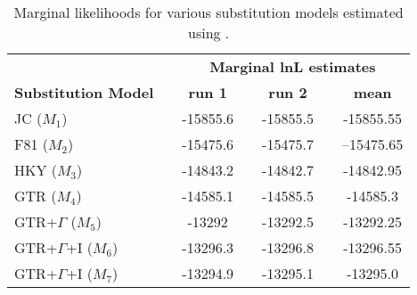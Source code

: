 \begin{Form}
\begin{table}[h]
\centering
\caption{\small Marginal likelihoods for various substitution models estimated using \RevBayes.}
\begin{tabular}{l c c c c c c}
\hline
\multicolumn{1}{l}{\textbf{ }} &\multicolumn{1}{r}{\textbf{ }} & \multicolumn{5}{c}{\textbf{Marginal lnL estimates}} \\ 
\cline{3-7}
\multicolumn{1}{l}{\textbf{Substitution Model}} & \multicolumn{1}{r}{\hspace{3mm}} & \multicolumn{1}{c}{\textbf{run 1}} & \multicolumn{1}{r}{\hspace{3mm}} & \multicolumn{1}{c}{\textbf{run 2}} & \multicolumn{1}{r}{\hspace{3mm}} & \multicolumn{1}{c}{\textbf{mean}} \\ 
\hline
JC ($M_1$) & \hspace{15mm} 					& -15855.6  		& \hspace{3mm} & -15855.5  		& \hspace{3mm} & -15855.55\\
\hline
F81 ($M_2$) & \hspace{15mm} 				& -15475.6   		& \hspace{3mm} & -15475.7 			& \hspace{3mm} &  --15475.65\\
\hline
HKY ($M_3$) & \hspace{15mm} 				&  -14843.2 		& \hspace{3mm} &  -14842.7  		& \hspace{3mm} & -14842.95 \\
\hline
GTR ($M_4$) & \hspace{15mm} 				& -14585.1  		& \hspace{3mm} &  -14585.5   		& \hspace{3mm} &  -14585.3\\
\hline
GTR+$\Gamma$ ($M_5$) & \hspace{15mm} 		& -13292  		& \hspace{3mm} & -13292.5   		& \hspace{3mm} & -13292.25 \\
\hline
GTR+$\Gamma$+I ($M_6$) & \hspace{15mm} 		& -13296.3  		& \hspace{3mm} & -13296.8   		& \hspace{3mm} & -13296.55 \\
\hline
GTR+$\Gamma$+I ($M_7$) & \hspace{15mm} 	& -13294.9 		& \hspace{3mm} & -13295.1  		& \hspace{3mm} & -13295.0 \\
\hline
\hline
\end{tabular}
\label{tab:ml_cytb}
\end{table}
\end{Form}




